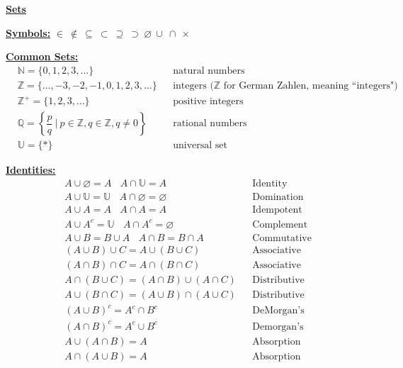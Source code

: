 \documentclass[11pt]{article}
\begin{document}
\newpage
{}

\begin{center}\underline{\bf \huge Sets}\end{center}
\bigskip

\underline{\bf Symbols:} $\in \ \not\in \ \subseteq \ \subset \ \supseteq \ \supset \ \varnothing \ \cup \ \cap \ \times$
\bigskip

\underline{\bf Common Sets:} 
\begin{align*}
    &\mathbb{N} = \{0, 1, 2, 3, \dots\}  &&\text{natural numbers} \\
    &\mathbb{Z} = \{\dots, -3, -2, -1, 0, 1, 2, 3, \dots \}  &&\text{integers ($\mathbb{Z}$ for German Zahlen, meaning ``integers")} \\
    &\mathbb{Z^+} = \{1,2,3,\dots\}  &&\text{positive integers} \\
    &\mathbb{Q} = \left\{ \dfrac{p}{q} \ \Big| \ p \in \mathbb{Z}, q \in \mathbb{Z}, q \neq 0\right\}  &&\text{rational numbers} \\
    &\mathbb{U} = \{*\}  &&\text{universal set}
\end{align*}
\bigskip

\underline{\bf Identities:}
\begin{align*}
    &A \cup \varnothing = A \ \ \ \ A \cap \mathbb{U} = A &&\text{Identity} \\
    &A \cup \mathbb{U} = \mathbb{U} \ \ \ \ A \cap \mathbb{\varnothing} = \varnothing &&\text{Domination} \\
    &A \cup A = A \ \ \ \ A \cap A = A &&\text{Idempotent} \\
    &A \cup A^c = \mathbb{U} \ \ \ \ A \cap A^c = \varnothing &&\text{Complement} \\
    &A \cup B = B \cup A \ \ \ \ A \cap B = B \cap A &&\text{Commutative} \\
    &(A \cup B ) \cup C = A \cup (B \cup C) &&\text{Associative} \\
    &(A \cap B) \cap C = A \cap (B \cap C) &&\text{Associative} \\
    &A \cap (B \cup C) = (A \cap B) \cup (A \cap C) &&\text{Distributive} \\
    &A \cup (B \cap C) = (A \cup B) \cap (A \cup C) &&\text{Distributive} \\
    &(A \cup B)^c = A^c \cap B^c &&\text{DeMorgan's} \\
    &(A \cap B)^c = A^c \cup B^c &&\text{Demorgan's} \\
    &A \cup (A \cap B) = A &&\text{Absorption} \\
    &A \cap (A \cup B) = A &&\text{Absorption}
\end{align*}
\bigskip
\end{document}

